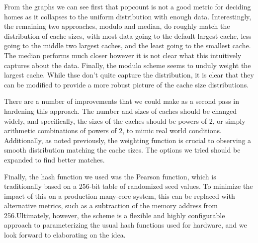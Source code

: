 From the graphs we can see first that popcount is not a good metric for deciding
homes as it collapses to the uniform distribution with enough data.
Interestingly, the remaining two approaches, modulo and median, do roughly match
the distribution of cache sizes, with most data going to the default largest
cache, less going to the middle two largest caches, and the least going to the
smallest cache.  The median performs much closer however it is not clear what
this intuitively captures about the data.  Finally, the modulo scheme seems to
unduly weight the largest cache.  While thse don't quite capture the
distribution, it is clear that they can be modified to provide a more robust
picture of the cache size distributions.  

There are a number of improvements that we could make as a second pass in
hardening this approach.  The number and sizes of caches should be changed
widely, and specifically, the sizes of the caches should be powers of 2, or
simply arithmetic combinations of powers of 2, to mimic real world
conditions. Additionally, as noted previously, the weighting function is crucial
to observing a smooth distribution matching the cache sizes.  The options we
tried should be expanded to find better matches.

Finally, the hash function we used was the Pearson function, which is
traditionally based on a 256-bit table of randomized seed values.  To minimize
the impact of this on a production many-core system, this can be replaced with
alternative metrics, such as a subtraction of the memory address from
256.Ultimately, however, the scheme is a flexible and highly configurable
approach to parameterizing the usual hash functions used for hardware, and we
look forward to elaborating on the idea.  
